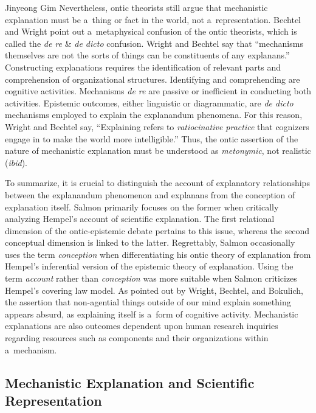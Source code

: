 \begin{artengenv}{Jinyeong Gim}
Nevertheless, ontic theorists still argue that mechanistic explanation must be a~thing or fact in the world, not a~representation. Bechtel and Wright point out a~metaphysical confusion of the ontic theorists, which is called the \textit{de re} \& \textit{de dicto} confusion. Wright and Bechtel
\parencite*[][p.51]{wright_mechanisms_2007} %
 say that ``mechanisms themselves are not the sorts of things can be constituents of any explanans.'' Constructing explanations requires the identification of relevant parts and comprehension of organizational structures. Identifying and comprehending are cognitive activities. Mechanisms \textit{de re} are passive or inefficient in conducting both activities. Epistemic outcomes, either linguistic or diagrammatic, are \textit{de dicto} mechanisms employed to explain the explanandum phenomena. For this reason, Wright and Bechtel 
\parencite*[][p.51]{wright_mechanisms_2007} %
 say, ``Explaining refers to \textit{ratiocinative practice} that cognizers engage in to make the world more intelligible.'' Thus, the ontic assertion of the nature of mechanistic explanation must be understood as \textit{metonymic}, not realistic (\textit{ibid}).

To summarize, it is crucial to distinguish the account of explanatory relationships between the explanandum phenomenon and explanans from the conception of explanation itself. Salmon primarily focuses on the former when critically analyzing Hempel's account of scientific explanation. The first relational dimension of the ontic-epistemic debate pertains to this issue, whereas the second conceptual dimension is linked to the latter. Regrettably, Salmon occasionally uses the term \textit{conception} when differentiating his ontic theory of explanation from Hempel's inferential version of the epistemic theory of explanation. Using the term \textit{account} rather than \textit{conception} was more suitable when Salmon criticizes Hempel's covering law model. As pointed out by Wright, Bechtel, and Bokulich, the assertion that non-agential things outside of our mind explain something appears absurd, as explaining itself is a~form of cognitive activity. Mechanistic explanations are also outcomes dependent upon human research inquiries regarding resources such as components and their organizations within a~mechanism.

\subsection{Mechanistic Explanation and Scientific Representation}


\end{artengenv}
